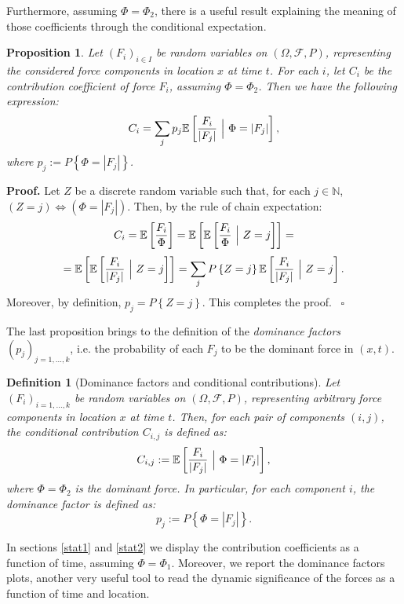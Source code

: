 \documentclass{article}
\newtheorem{definition}[theorem]{Definition}
\newtheorem{proposition}[theorem]{Proposition}
\newenvironment{proof}[1][Proof]{\noindent\textbf{#1.} }{\ $\square$}
\begin{document}
Furthermore, assuming $\Phi=\Phi_2$, there is a useful result explaining the meaning of those coefficients through the conditional expectation.
\begin{proposition}
Let $(F_i)_{i\in I}$ be random variables on $(\Omega, \mathcal F, P)$, representing the considered force components in location $x$ at time $t$. For each $i$, let $C_i$ be the contribution coefficient of force $F_i$, assuming $\Phi=\Phi_2$. Then we have the following expression:
$$C_i=\sum_j p_j \mathbb E\left[\frac{F_i}{|F_j|}\ \Big{|}\ \Phi=|F_j|\right],$$
where $p_j:=P\left\{\Phi=|F_j|\right\}$.
\end{proposition}

\begin{proof}
Let $Z$ be a discrete random variable such that, for each $j\in\mathbb N$, $(Z=j) \Longleftrightarrow (\Phi=|F_j|)$. Then, by the rule of chain expectation:
$$C_i=\mathbb E\left[\frac{F_i}{\Phi}\right]=\mathbb E\left[\mathbb E\left[\frac{F_i}{\Phi}\ \Big{|}\ Z=j\right]\right]=$$
$$=\mathbb E\left[\mathbb E\left[\frac{F_i}{|F_j|}\ \Big{|}\ Z=j\right]\right]=\sum_j P\left\{Z=j\right\} \mathbb E\left[\frac{F_i}{|F_j|}\ \Big{|}\ Z=j\right].$$
Moreover, by definition, $p_j=P\left\{Z=j\right\}$. This completes the proof.
\end{proof}

The last proposition brings to the definition of the \emph{dominance factors} $(p_j)_{j=1,\dots, k}$, i.e. the probability of each $F_j$ to be the dominant force in $(x,t)$.

\begin{definition}[Dominance factors and conditional contributions]
Let $(F_i)_{i=1,\dots, k}$ be random variables on $(\Omega, \mathcal F, P)$, representing arbitrary force components in location $x$ at time $t$. Then, for each pair of components $(i,j)$, the conditional contribution $C_{i,j}$ is defined as:
$$C_{i,j}:=\mathbb E\left[\frac{F_i}{|F_j|}\ \Big{|}\ \Phi=|F_j|\right],$$
where $\Phi=\Phi_2$ is the dominant force. In particular, for each component $i$, the dominance factor is defined as:
$$p_j:=P\left\{\Phi=|F_j|\right\}.$$
\end{definition}

In sections \ref{stat1} and \ref{stat2} we display the contribution coefficients as a function of time, assuming $\Phi=\Phi_1$. Moreover, we report the dominance factors plots, another very useful tool to read the dynamic significance of the forces as a function of time and location.

\newpage
\end{document}
